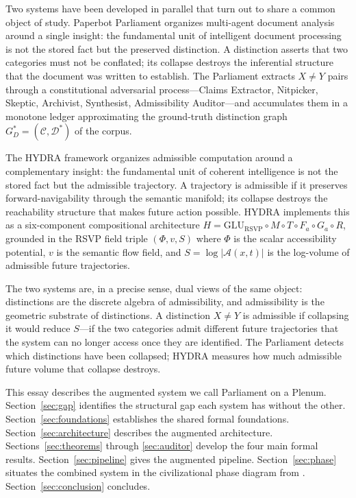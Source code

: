 \documentclass[12pt, a4paper]{article}
\theoremstyle{plain}
\theoremstyle{definition}
\theoremstyle{remark}
\begin{document}
Two systems have been developed in parallel that turn out to share a common
object of study. Paperbot Parliament \cite{flyxionparliament} organizes multi-agent
document analysis around a single insight: the fundamental unit of intelligent
document processing is not the stored fact but the preserved distinction. A
distinction asserts that two categories must not be conflated; its collapse destroys the
inferential structure that the document was written to establish. The Parliament
extracts $X \neq Y$ pairs through a constitutional adversarial process---Claims Extractor,
Nitpicker, Skeptic, Archivist, Synthesist, Admissibility Auditor---and accumulates them
in a monotone ledger approximating the ground-truth distinction graph $G_D^* = (\mathcal{C}, \mathcal{D}^*)$ of the corpus.

The HYDRA framework \cite{flyxionhydra} organizes admissible computation around
a complementary insight: the fundamental unit of coherent intelligence is not the
stored fact but the admissible trajectory. A trajectory is admissible if it preserves
forward-navigability through the semantic manifold; its collapse destroys the
reachability structure that makes future action possible. HYDRA implements this
as a six-component compositional architecture $H = \mathrm{GLU}_\mathrm{RSVP} \circ M \circ T \circ F_a \circ G_a \circ R$,
grounded in the RSVP field triple $(\Phi, v, S)$ where $\Phi$ is the scalar accessibility
potential, $v$ is the semantic flow field, and $S = \log|\mathcal{A}(x,t)|$ is the
log-volume of admissible future trajectories.

The two systems are, in a precise sense, dual views of the same object: distinctions
are the discrete algebra of admissibility, and admissibility is the geometric
substrate of distinctions. A distinction $X \neq Y$ is admissible if collapsing it
would reduce $S$---if the two categories admit different future trajectories that
the system can no longer access once they are identified. The Parliament detects
which distinctions have been collapsed; HYDRA measures how much admissible
future volume that collapse destroys.

This essay describes the augmented system we call Parliament on a Plenum.
Section~\ref{sec:gap} identifies the structural gap each system has without the
other. Section~\ref{sec:foundations} establishes the shared formal foundations.
Section~\ref{sec:architecture} describes the augmented architecture. Sections~\ref{sec:theorems}
through \ref{sec:auditor} develop the four main formal results. Section~\ref{sec:pipeline}
gives the augmented pipeline. Section~\ref{sec:phase} situates the combined
system in the civilizational phase diagram from \cite{flyxionreachability}.
Section~\ref{sec:conclusion} concludes.
\end{document}
